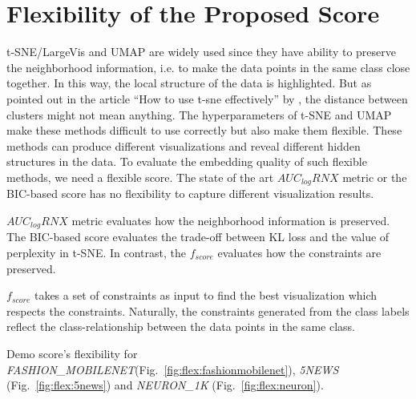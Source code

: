 \section{Flexibility of the Proposed Score}

t-SNE/LargeVis and UMAP are widely used since they have ability to preserve the neighborhood information, i.e. to make the data points in the same class close together.
In this way, the local structure of the data is highlighted.
But as pointed out in the article ``How to use t-sne effectively'' by \citet{wattenberg2016use}, the distance between clusters might not mean anything.
The hyperparameters of t-SNE and UMAP make these methods difficult to use correctly but also make them flexible.
These methods can produce different visualizations and reveal different hidden structures in the data.
To evaluate the embedding quality of such flexible methods, we need a flexible score.
The state of the art $AUC_{log}RNX$ metric or the BIC-based score has no flexibility to capture different visualization results.

$AUC_{log}RNX$ metric evaluates how the neighborhood information is preserved.
The BIC-based score evaluates the trade-off between KL loss and the value of perplexity in t-SNE.
In contrast, the $f_{score}$ evaluates how the constraints are preserved.

$f_{score}$ takes a set of constraints as input to find the best visualization which respects the constraints.
Naturally, the constraints generated from the class labels reflect the class-relationship between the data points in the same class.

Demo score's flexibility for \emph{FASHION\_MOBILENET}(Fig.~\ref{fig:flex:fashionmobilenet}), \emph{5NEWS} (Fig.~\ref{fig:flex:5news}) and \emph{NEURON\_1K} (Fig.~\ref{fig:flex:neuron}).

\begin{figure*}[pos=h]
    \centering
    \texttt{[image: \{FASHION\_MOBILENET\_score\_flexibility]}.png}
    \caption{Flexibility of $f_{score}$ for \emph{FASHION\_MOBILENET} dataset}
    \label{fig:flex:fashionmobilenet}
\end{figure*}

\begin{figure*}[pos=h]
    \centering
    \texttt{[image: \{20NEWS5\_score\_flexibility]}.png}
    \caption{Flexibility of $f_{score}$ for \emph{5NEWS} dataset}
    \label{fig:flex:5news}
\end{figure*}

